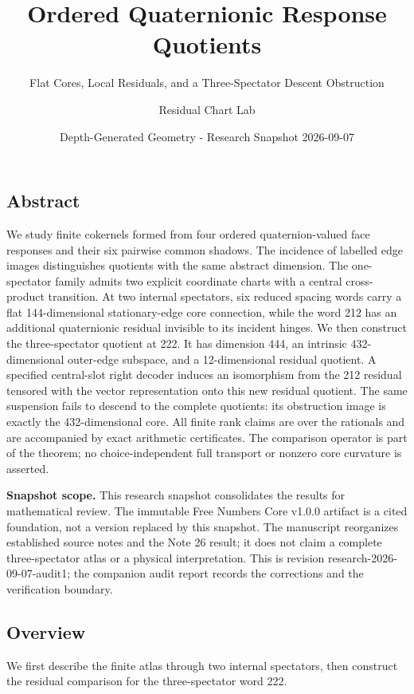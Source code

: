 \documentclass[
  11pt,
  a4paper,
]{article}
\title{Ordered Quaternionic Response Quotients}
\subtitle{Flat Cores, Local Residuals, and a Three-Spectator Descent
Obstruction}
\author{Residual Chart Lab}
\date{Depth-Generated Geometry - Research Snapshot 2026-09-07}
\begin{document}
\maketitle

\hypertarget{abstract}{%
\subsection{Abstract}\label{abstract}}

We study finite cokernels formed from four ordered quaternion-valued
face responses and their six pairwise common shadows. The incidence of
labelled edge images distinguishes quotients with the same abstract
dimension. The one-spectator family admits two explicit coordinate
charts with a central cross-product transition. At two internal
spectators, six reduced spacing words carry a flat 144-dimensional
stationary-edge core connection, while the word 212 has an additional
quaternionic residual invisible to its incident hinges. We then
construct the three-spectator quotient at 222. It has dimension 444, an
intrinsic 432-dimensional outer-edge subspace, and a 12-dimensional
residual quotient. A specified central-slot right decoder induces an
isomorphism from the 212 residual tensored with the vector
representation onto this new residual quotient. The same suspension
fails to descend to the complete quotients: its obstruction image is
exactly the 432-dimensional core. All finite rank claims are over the
rationals and are accompanied by exact arithmetic certificates. The
comparison operator is part of the theorem; no choice-independent full
transport or nonzero core curvature is asserted.

\textbf{Snapshot scope.} This research snapshot consolidates the results
for mathematical review. The immutable Free Numbers Core v1.0.0 artifact
is a cited foundation, not a version replaced by this snapshot. The
manuscript reorganizes established source notes and the Note 26 result;
it does not claim a complete three-spectator atlas or a physical
interpretation. This is revision research-2026-09-07-audit1; the
companion audit report records the corrections and the verification
boundary.

\hypertarget{overview}{%
\subsection{Overview}\label{overview}}

We first describe the finite atlas through two internal spectators, then
construct the residual comparison for the three-spectator word 222.
\end{document}
